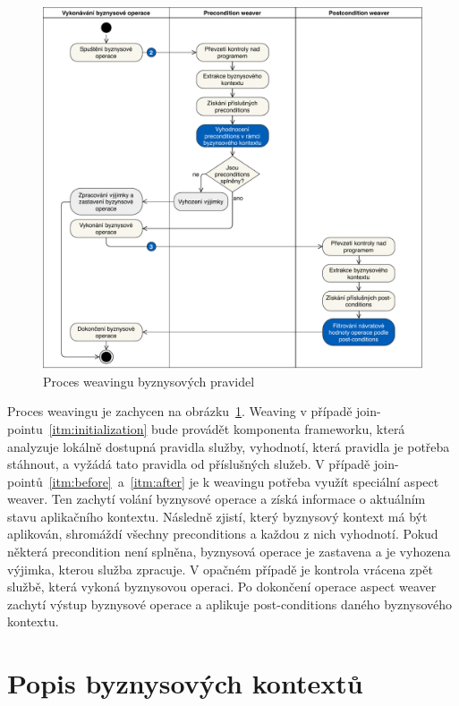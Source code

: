 \begin{figure}
    \centering
    \includegraphics[keepaspectratio=true, width=0.9\linewidth]{figures/business-rules-weaver.pdf}
    \caption{Proces weavingu byznysov\'ych pravidel}
    \label{fig:business-rules-weaver}
\end{figure}

Proces weavingu je zachycen na obrázku~\ref{fig:business-rules-weaver}. Weaving v případě
join-pointu~\ref{itm:initialization} bude provádět komponenta frameworku, která
analyzuje lokálně dostupná pravidla služby, vyhodnotí, která pravidla je potřeba stáhnout,
a vyžádá tato pravidla od příslušných služeb. V případě join-pointů~\ref{itm:before}~a~\ref{itm:after}
je k weavingu potřeba využít speciální aspect weaver. Ten zachytí volání byznysové operace a získá
informace o aktuálním stavu aplikačního kontextu. Následně zjistí, který byznysový kontext má být aplikován,
shromáždí všechny preconditions a každou z nich vyhodnotí. Pokud některá precondition není splněna, byznysová
operace je zastavena a je vyhozena výjimka, kterou služba zpracuje. V opačném případě je kontrola vrácena zpět
službě, která vykoná byznysovou operaci. Po dokončení operace aspect weaver zachytí výstup byznysové
operace a aplikuje post-conditions daného byznysového kontextu.

\section{Popis byznysových kontextů}

